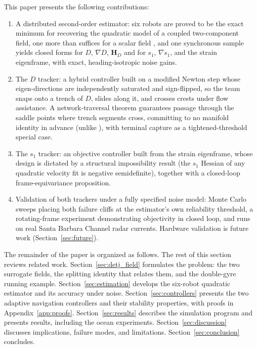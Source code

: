 \documentclass[lettersize,journal]{IEEEtran}
\begin{document}
This paper presents the following contributions:
\begin{enumerate}
    \item A distributed second-order estimator: six robots are proved
          to be the exact minimum for recovering the quadratic model of
          a coupled two-component field, one more than suffices for a
          scalar field \cite{15}, and one synchronous sample yields
          closed forms for $D$, $\nabla D$, $\mathbf{H}_D$ and for
          $s_1$, $\nabla s_1$, and the strain eigenframe, with exact,
          heading-isotropic noise gains.
    \item The $D$ tracker: a hybrid controller built on a
          modified Newton step whose eigen-directions are independently
          saturated and sign-flipped, so the team snaps onto a trench
          of $D$, slides along it, and crosses crests under flow
          assistance. A network-traversal theorem guarantees passage
          through the saddle points where trench segments cross,
          committing to no manifold identity in advance (unlike
          \cite{9,10}), with terminal capture as a tightened-threshold
          special case.
    \item The $s_1$ tracker: an objective controller built from the
          strain eigenframe, whose design is dictated by a structural
          impossibility result (the $s_1$ Hessian of any quadratic
          velocity fit is negative semidefinite), together with a
          closed-loop frame-equivariance proposition.
    \item Validation of both trackers under a fully specified noise
          model: Monte Carlo sweeps placing both failure cliffs at the
          estimator's own reliability threshold, a rotating-frame
          experiment demonstrating objectivity in closed loop, and runs
          on real Santa Barbara Channel radar currents. Hardware
          validation is future work (Section~\ref{sec:future}).
\end{enumerate}

The remainder of the paper is organized as follows. The rest of this
section reviews related work. Section~\ref{sec:detj_field} formulates
the problem: the two surrogate fields, the splitting identity that
relates them, and the double-gyre running example.
Section~\ref{sec:estimation} develops the six-robot quadratic estimator
and its accuracy under noise. Section~\ref{sec:controllers} presents
the two adaptive navigation controllers and their stability properties,
with proofs in Appendix~\ref{app:proofs}. Section~\ref{sec:results}
describes the simulation program and presents results, including the
ocean experiments. Section~\ref{sec:discussion} discusses implications,
failure modes, and limitations. Section~\ref{sec:conclusion} concludes.
\end{document}
